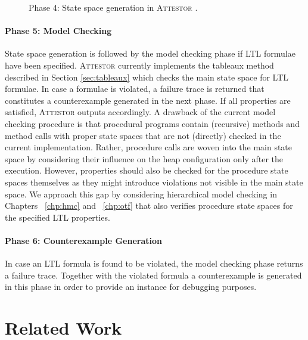 \documentclass[a4paper, 12pt, twoside]{report}
\begin{document}
\begin{figure}[!h]
\begin{center}
{}
			\caption{Phase 4: State space generation in \textsc{Attestor} \cite{arndt2018let}.}\label{fig:stateSpaceGeneration}
		\end{center}
	\end{figure}
	
	\paragraph{Phase 5: Model Checking}
	State space generation is followed by the model checking phase if LTL formulae have been specified. \textsc{Attestor} currently implements the tableaux method described in Section \ref{sec:tableaux} which checks the main state space for LTL formulae. In case a formulae is violated, a failure trace is returned that constitutes a counterexample generated in the next phase. If all properties are satisfied, \textsc{Attestor} outputs accordingly. A drawback of the current model checking procedure is that procedural programs contain (recursive) methods and method calls with proper state spaces that are not (directly) checked in the current implementation. Rather, procedure calls are woven into the main state space by considering their influence on the heap configuration only after the execution. However, properties should also be checked for the procedure state spaces themselves as they might introduce violations not visible in the main state space. We approach this gap by considering hierarchical model checking in Chapters ~\ref{chp:hmc} and ~\ref{chp:otf} that also verifies procedure state spaces for the specified LTL properties.
	
	\paragraph{Phase 6: Counterexample Generation}
	In case an LTL formula is found to be violated, the model checking phase returns a failure trace. Together with the violated formula a counterexample is generated in this phase in order to provide an instance for debugging purposes.

	\section{Related Work}
	
\end{document}
